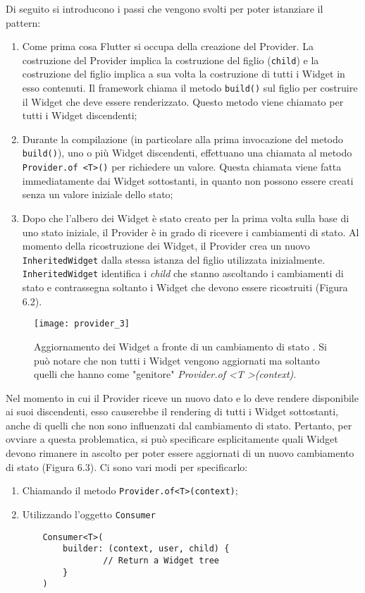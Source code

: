 Di seguito si introducono i passi che vengono svolti per poter istanziare il pattern:
\begin{enumerate}
	\item Come prima cosa Flutter si occupa della creazione del Provider. La costruzione del Provider implica la costruzione del figlio (\verb|child|) e la costruzione del figlio implica a sua volta la costruzione di tutti i Widget in esso contenuti. Il framework chiama il metodo \verb|build()| sul figlio per costruire il Widget che deve essere renderizzato. Questo metodo viene chiamato per tutti i Widget discendenti;
	\item Durante la compilazione (in particolare alla prima invocazione del metodo \verb|build()|), uno o più Widget discendenti, effettuano una chiamata al metodo \verb|Provider.of <T>()| per richiedere un valore. Questa chiamata viene fatta immediatamente dai Widget sottostanti, in quanto non possono essere creati senza un valore iniziale dello stato;
	\item Dopo che l'albero dei Widget è stato creato per la prima volta sulla base di uno stato iniziale, il Provider è in grado di ricevere i cambiamenti di stato. Al momento della ricostruzione dei Widget, il Provider crea un nuovo \verb|InheritedWidget| dalla stessa istanza del figlio utilizzata inizialmente. \verb|InheritedWidget| identifica i \textit{child} che stanno ascoltando i cambiamenti di stato e contrassegna soltanto i Widget che devono essere ricostruiti (Figura 6.2).
\end{enumerate}

\begin{figure}
	\begin{center}
		\texttt{[image: provider\_3]}
		\caption[Provider - Aggiornamento]{Aggiornamento dei Widget a fronte di un cambiamento di stato \cite{provider_first}. Si può notare che non tutti i Widget vengono aggiornati ma soltanto quelli che hanno come "genitore" \textit{Provider.of \textless T \textgreater (context)}.}
		\label{figura:provider_3}
	\end{center}
\end{figure}

\label{consumer}
Nel momento in cui il Provider riceve un nuovo dato e lo deve rendere disponibile ai suoi discendenti, esso causerebbe il rendering di tutti i Widget sottostanti, anche di quelli che non sono influenzati dal cambiamento di stato. Pertanto, per ovviare a questa problematica, si può specificare esplicitamente quali Widget devono rimanere in ascolto per poter essere aggiornati di un nuovo cambiamento di stato (Figura 6.3). Ci sono vari modi per specificarlo:
\begin{enumerate}
	\item Chiamando il metodo \verb|Provider.of<T>(context)|;
	\item Utilizzando l'oggetto \verb|Consumer|
	\begin{lstlisting}
	Consumer<T>(
  		builder: (context, user, child) {
    			// Return a Widget tree
		}
	)
	\end{lstlisting}
\end{enumerate}

